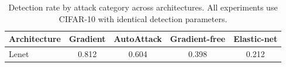 \begin{table}[t]
\centering
\caption{Detection rate by attack category across architectures. All experiments use CIFAR-10 with identical detection parameters.}
\label{tab:per_attack}
\begin{tabular}{l|cccc}
\toprule
Architecture & Gradient & AutoAttack & Gradient-free & Elastic-net \\
\midrule
Lenet & 0.812 & 0.604 & 0.398 & 0.212 \\
\bottomrule
\end{tabular}
\end{table}